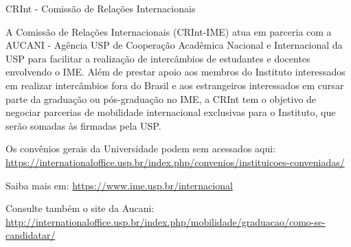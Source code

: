 \begin{secao}{CRInt - Comissão de Relações Internacionais}

A Comissão de Relações Internacionais (CRInt-IME) atua em parceria com a AUCANI - 
Agência USP de Cooperação Acadêmica Nacional e Internacional da USP para facilitar a realização de
intercâmbios de estudantes e docentes envolvendo o IME. Além de prestar apoio aos
membros do Instituto interessados em realizar intercâmbios fora do Brasil e aos
estrangeiros interessados em cursar parte da graduação ou pós-graduação no IME,
a CRInt tem o objetivo de negociar parcerias de mobilidade internacional exclusivas
para o Instituto, que serão somadas às firmadas pela USP.

Os convênios gerais da Universidade podem sem acessados aqui:
\url{https://internationaloffice.usp.br/index.php/convenios/instituicoes-conveniadas/}

Saiba mais em: \url{https://www.ime.usp.br/internacional}

Consulte também o site da Aucani: \url{http://internationaloffice.usp.br/index.php/mobilidade/graduacao/como-se-candidatar/}

\end{secao}
